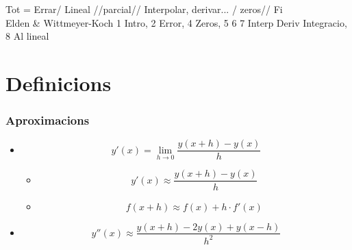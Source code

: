 \documentclass[a4paper,10pt]{article}
\newcommand{\red}[1]{{\color{red}#1}}
\begin{document}
Tot = Errar/ Lineal //parcial// Interpolar, derivar... / zeros// Fi\\
Elden \& Wittmeyer-Koch
1 Intro, 2 Error, 4 Zeros, 5 6 7 Interp Deriv Integracio, 8 Al lineal
\tableofcontents

\part{\red{D}efinicions}
\section{Aproximacions}
\begin{itemize}
\item $$y'(x) = \lim_{h \to 0} \frac{y(x + h) - y(x)}{h}$$
	\begin{itemize}
	\item $$y'(x) \approx \frac{y(x + h) - y(x)}{h}$$
	\item $$f(x + h) \approx f(x) + h\cdot f'(x)$$
	\end{itemize}
\item $$y''(x) \approx \frac{y(x + h) - 2y(x) + y(x - h)}{h^2}$$
\end{itemize}
\end{document}
